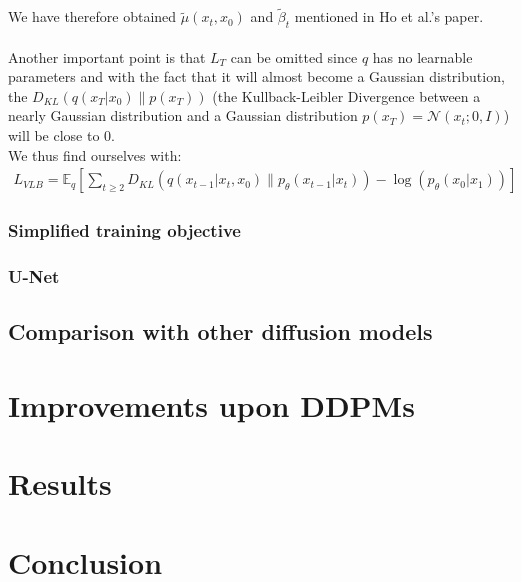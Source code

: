 \documentclass{article}
\begin{document}
We have therefore obtained $\tilde{\mu}(x_t, x_0)$ and $\tilde{\beta}_t$ mentioned in Ho et al.'s \cite{ho2020denoising} paper.
\\\\
Another important point is that $L_T$ can be omitted since $q$ has no learnable parameters and with the fact that it will almost become a Gaussian distribution, the $D_{KL}\left(q\left(x_T | x_0\right) \| p\left(x_T\right)\right)$ (the Kullback-Leibler Divergence between a nearly Gaussian distribution and a Gaussian distribution $p\left(x_T\right) = \mathcal{N}\left(x_t; 0, I\right)$) will be close to 0. \cite{ho2020denoising} \\
We thus find ourselves with:
\begin{gather}
  L_{VLB} = \mathbb{E}_q \left[ \sum_{t \geq 2} D_{KL}\left(q\left(x_{t-1} | x_t, x_0\right) \| p_{\theta}\left(x_{t-1} | x_t\right)\right) - \log\left(p_{\theta}\left(x_0 | x_1\right)\right) \right]
\end{gather}



\subsubsection{Simplified training objective}

\subsubsection{U-Net}


\subsection{Comparison with other diffusion models}

\newpage
\section{Improvements upon DDPMs}

\newpage
\section{Results}

\newpage
\section{Conclusion}


\newpage
\printbibliography
\end{document}
